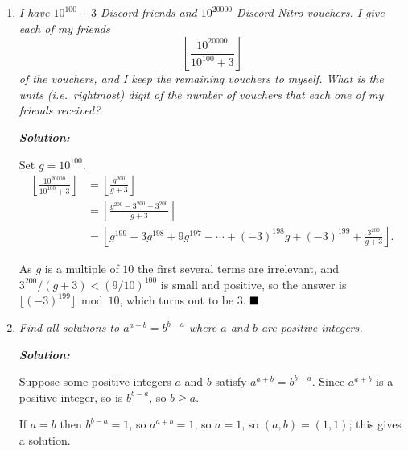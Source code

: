 \documentclass[12pt]{article}
\newcommand{\sol}{\textbf{\textit{Solution: }}}
\begin{document}
\begin{enumerate}[topsep=2\bigskipamount,itemsep=\bigskipamount]
\item \textit{I have $10^{100}+3$ Discord friends and $10^{20000}$ Discord Nitro vouchers.
I give each of my friends
\[\left\lfloor\frac{10^{20000}}{10^{100} + 3}\right\rfloor\]
of the vouchers, and I keep the remaining vouchers to myself.
What is the units (i.e.~rightmost) digit of the number of vouchers that each one of my friends received?}

\sol

Set $g = 10^{100}$.
\begin{align*}
\left\lfloor\frac{10^{20000}}{10^{100} + 3}\right\rfloor & = \left\lfloor\frac{g^{200}}{g + 3}\right\rfloor\\ 
& = \left\lfloor\frac{g^{200} - 3^{200} + 3^{200}}{g + 3}\right\rfloor\\
& = \left\lfloor g^{199} - 3g^{198} + 9g^{197} - \cdots + (-3)^{198}g + (-3)^{199} + \frac{3^{200}}{g + 3}\right\rfloor{}. 
\end{align*}

As $g$ is a multiple of $10$ the first several terms are irrelevant, and $3^{200}/(g + 3) < (9/10)^{100}$ is small and positive, so the answer is $\lfloor(-3)^{199}\rfloor \bmod 10$, which turns out to be $3$. $\hfill\blacksquare$

\item \textit{Find all solutions to $a^{a+b} = b^{b-a}$ where $a$ and $b$ are positive integers.}

\sol

Suppose some positive integers $a$ and $b$ satisfy $a^{a+b} = b^{b-a}$. Since $a^{a+b}$ is a positive integer, so is $b^{b-a}$, so $b \geqslant a$.

If $a = b$ then $b^{b-a} = 1$, so $a^{a+b} = 1$, so $a = 1$, so $(a, b) = (1, 1)$; this gives a solution.


\end{enumerate}
\end{document}
